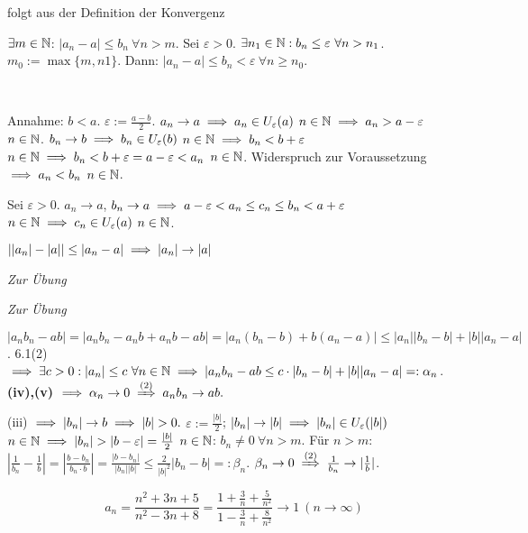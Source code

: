 \documentclass[a4paper,twoside,DIV15,BCOR12mm]{scrbook}
\begin{document}
\begin{beweise}
\item folgt aus der Definition der Konvergenz
\item $\exists m\in\mathbb{N}$: $|a_n - a| \le b_n\ \forall n>m$. Sei $\varepsilon >0$. $\exists n_1\in\MdN: b_n \le \varepsilon \ \forall n>n_1$. $m_0 := \max\{m,n1\}$. Dann: $|a_n - a| \le b_n < \varepsilon\ \forall n \ge n_0$.
\item \
\begin{liste}
\item Annahme: $b<a$. $\varepsilon := \frac{a-b}{2}$. $a_n \to a \implies a_n \in U_\varepsilon(a)$ \ffa $n\in\mathbb{N} \implies a_n > a- \varepsilon$ \ffa $n\in\mathbb{N}$. $b_n \to b \implies b_n \in U_\varepsilon(b)$ \ffa $n\in\mathbb{N} \implies b_n < b+\varepsilon$ \ffa $n\in\mathbb{N} \implies b_n < b + \varepsilon = a-\varepsilon < a_n$ \ffa $n\in\mathbb{N}$. Widerspruch zur Voraussetzung $\implies a_n < b_n$ \ffa $n\in\mathbb{N}$.
\item Sei $\varepsilon > 0$. $a_n \to a$, $b_n \to a \implies a-\varepsilon < a_n \le c_n \le b_n < a+\varepsilon$ \ffa $n\in\mathbb{N} \implies c_n \in U_\varepsilon(a)$ \ffa $n\in\mathbb{N}$.
\item $||a_n| - |a|| \le |a_n - a| \implies |a_n| \to |a|$
\item \textit{Zur Übung}
\item \textit{Zur Übung}
\item $|a_nb_n - ab| = |a_nb_n - a_nb + a_n b - ab| = |a_n(b_n-b)+ b(a_n-a)| \le |a_n||b_n - b|+|b||a_n-a|$. 6.1(2) $\folgt \exists c > 0: |a_n| \le c\ \forall n\in\MdN \folgt |a_nb_n-ab \le c\cdot|b_n-b| + |b||a_n-a| =: \alpha_n$. \textbf{(iv),(v)} $\folgt \alpha_n \to 0 \folgtnach{(2)} a_nb_n \to ab.$
\item (iii) $\folgt |b_n|\to b \folgt |b|>0.$ $\varepsilon := \frac{|b|}2$; $|b_n| \to |b| \implies |b_n| \in U_\varepsilon(|b|)$ \ffa $n\in\MdN \folgt |b_n|>|b-\varepsilon| = \frac{|b|}2$ \ffa $n\in\mathbb{N}$: $b_n \ne 0 \ \forall n>m$. Für $n>m$: $|\frac{1}{b_n} - \frac{1}{b}| = |\frac{b-b_n}{b_n\cdot b}| = \frac{|b-b_n|}{|b_n||b|} \le \frac{2}{|b|^2}|b_n-b| =: \beta_n$. $\beta_n \to 0 \folgtnach{(2)} \frac{1}{b_n} \to |\frac{1}{b}|$.
\end{liste}
\end{beweise}

\begin{beispiel}
$$ a_n = \frac{n^2+3n+5}{n^2-3n+8} = \frac{1 + \frac{3}n + \frac{5}{n^2}}{1-\frac{3}{n} + \frac{8}{n^2}} \to 1 \ (n\to\infty)$$
\end{beispiel}
\end{document}
